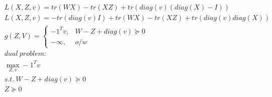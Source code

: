 \documentclass[12pt,letter]{article}
\begin{document}
\begin{enumerate}
\begin{enumerate}
\begin{enumerate}
    \begin{align*}
      &L(X,Z,v) = tr(WX) - tr(XZ) + tr(diag(v)(diag(X)-I))\\
      &L(X,Z,v) = -tr(diag(v)I) + tr(WX) - tr(XZ) + tr(diag(v)diag(X))\\
      &g(Z,V) =
        \begin{cases}
          -1^T v ,& W - Z + diag(v) \succeq 0\\
          -\infty ,& o/w
        \end{cases}\\
      &dual\ problem:\\
      &\max_{Z,v} -1^T v\\
      &s.t.\ W - Z + diag(v) \succeq 0\\
      &Z \succeq 0
    \end{align*}
    
    

\end{enumerate}
\end{enumerate}
\end{enumerate}
\end{document}
